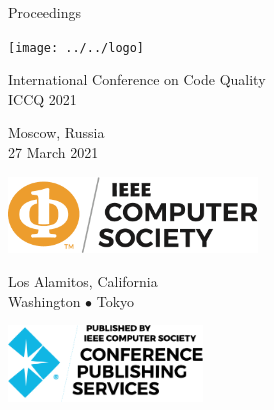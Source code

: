 \thispagestyle{empty}
\begin{center}
Proceedings

\vspace{1in}

\texttt{[image: ../../logo]}

\vspace{0.5in}

{\Large International Conference on Code Quality\\[12pt]
ICCQ 2021}

\vspace{0.5in}

Moscow, Russia\\
27 March 2021

\vspace{3in}

\begin{multicols}{3}
\includegraphics[height=0.8in]{../images/ieee-cs-logo}
\columnbreak

Los Alamitos, California\\
Washington $\bullet$ Tokyo

\columnbreak
\includegraphics[height=0.8in]{../images/ieee-cps-logo}
\end{multicols}
\end{center}
